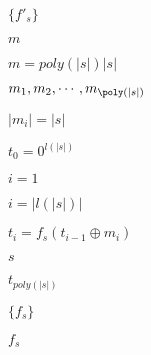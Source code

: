 \documentclass[10pt]{book}
\begin{document}
\begin{mdSnippets}
\begin{mdInlineSnippet}[d2a9c8322690fce87499dd560ac2f432]
$\{ f'_s \}$\end{mdInlineSnippet}%
\begin{mdInlineSnippet}[6f8f57715090da2632453988d9a1501b]%
$m$\end{mdInlineSnippet}%
\begin{mdInlineSnippet}[3829760df67ea83c5d8a3fcfe1c345f9]%
$m = poly(|s|)|s|$\end{mdInlineSnippet}%
\begin{mdInlineSnippet}%
$m_1,m_2, \cdots, m_{\poly(|s|)}$\end{mdInlineSnippet}%
\begin{mdInlineSnippet}[bb2e03812517fb9424f1448c2496f5a7]%
$|m_i| = |s|$\end{mdInlineSnippet}%
\begin{mdInlineSnippet}[e6e6dcfbee965dc7b64798b259e265a4]%
$t_0 = 0^{l(|s|)}$\end{mdInlineSnippet}%
\begin{mdInlineSnippet}%
$i = 1$\end{mdInlineSnippet}%
\begin{mdInlineSnippet}%
$i = |l(|s|)|$\end{mdInlineSnippet}%
\begin{mdInlineSnippet}[6e38f2f00f225e85f50bb9613fb4f9e7]%
$t_i = f_s(t_{i-1} \oplus m_i)$\end{mdInlineSnippet}%
\begin{mdInlineSnippet}[03c7c0ace395d80182db07ae2c30f034]%
$s$\end{mdInlineSnippet}%
\begin{mdInlineSnippet}%
$t_{poly(|s|)}$\end{mdInlineSnippet}%
\begin{mdInlineSnippet}[37a2ce8e5337ae1139e64a8ff1f2f6bb]%
$\{ f_s \}$\end{mdInlineSnippet}%
\begin{mdInlineSnippet}[983340c663380eacde4a09812e2e3c2c]%
$f_s$\end{mdInlineSnippet}%
\begin{mdInlineSnippet}%

\end{mdInlineSnippet}
\end{mdSnippets}
\end{document}
